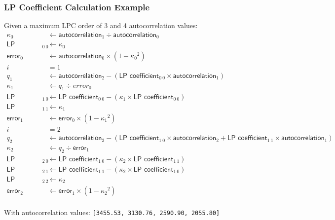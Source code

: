 \subsubsection{LP Coefficient Calculation Example}
Given a maximum LPC order of 3 and 4 autocorrelation values:
{
  \begin{align*}
    \kappa_0 &\leftarrow \textsf{autocorrelation}_1 \div \textsf{autocorrelation}_0 \\
    \textsf{LP coefficient}_{0~0} &\leftarrow \kappa_0 \\
    \textsf{error}_0 &\leftarrow \textsf{autocorrelation}_0 \times (1 - {\kappa_0} ^ 2) \\
    i &= 1 \\
    q_1 &\leftarrow \textsf{autocorrelation}_2 - (\textsf{LP coefficient}_{0~0} \times \textsf{autocorrelation}_{1}) \\
    \kappa_1 &\leftarrow q_1 \div error_0 \\
    \textsf{LP coefficient}_{1~0} &\leftarrow \textsf{LP coefficient}_{0~0} - (\kappa_1 \times \textsf{LP coefficient}_{0~0}) \\
    \textsf{LP coefficient}_{1~1} &\leftarrow \kappa_1 \\
    \textsf{error}_1 &\leftarrow \textsf{error}_0 \times (1 - {\kappa_1} ^ 2) \\
    i &= 2 \\
    q_2 &\leftarrow \textsf{autocorrelation}_3 - (\textsf{LP coefficient}_{1~0} \times \textsf{autocorrelation}_{2} + \textsf{LP coefficient}_{1~1} \times \textsf{autocorrelation}_{1}) \\
    \kappa_2 &\leftarrow q_2 \div \textsf{error}_1 \\
    \textsf{LP coefficient}_{2~0} &\leftarrow \textsf{LP coefficient}_{1~0} - (\kappa_2 \times \textsf{LP coefficient}_{1~1}) \\
    \textsf{LP coefficient}_{2~1} &\leftarrow \textsf{LP coefficient}_{1~1} - (\kappa_2 \times \textsf{LP coefficient}_{1~0}) \\
    \textsf{LP coefficient}_{2~2} &\leftarrow \kappa_2 \\
    \textsf{error}_2 &\leftarrow \textsf{error}_1 \times (1 - {\kappa_2} ^ 2) \\
\end{align*}
}
\par
\noindent
With \textsf{autocorrelation} values: \texttt{[3455.53, 3130.76, 2590.90, 2055.80]}
